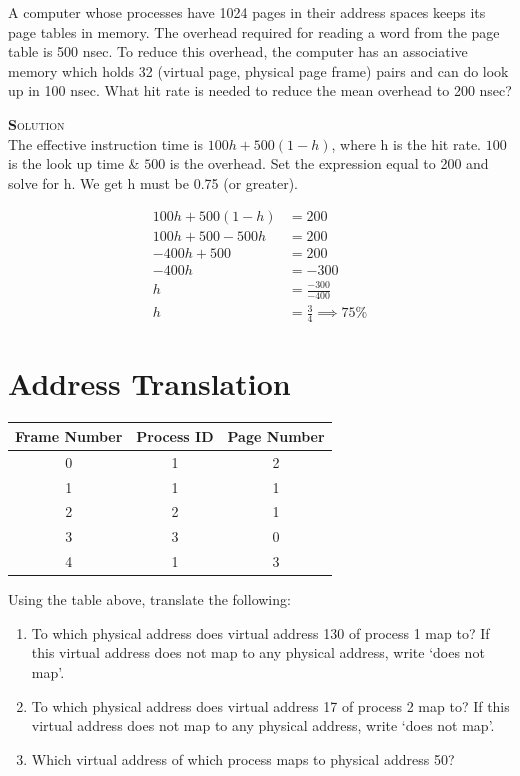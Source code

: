 \documentclass{article}
\newcommand{\smallcaps}[1]{\textsc{\textbf #1}\\}
\begin{document}
  \begin{multicols}{2}
    A computer whose processes have 1024 pages in their address spaces keeps
    its page tables in memory. The overhead required for reading a word from
    the page table is 500 nsec.  To reduce this  overhead, the computer has an
    associative  memory  which holds 32 (virtual  page,  physical  page frame)
    pairs and can do look up in 100 nsec.  What hit rate is needed  to reduce
    the mean overhead to 200 nsec?

    \smallcaps{Solution}

    The effective instruction time is $100h + 500(1-h)$, where h is the
    hit rate. $100$ is the look up time \& $500$ is the overhead. Set the
    expression equal to 200 and solve for h. We get h must be 0.75 (or greater).

    \begin{align*}
      100h + 500(1-h) &= 200 \\
      100h + 500 - 500h &= 200 \\
      -400h + 500 &= 200 \\
      -400h &= -300 \\
      h &= \frac{-300}{-400} \\
      h &= \frac{3}{4} \implies 75\%
    \end{align*}

    \section*{Address Translation}
    \begin{tabular}{|c|c|c|}
      \hline
      Frame Number & Process ID & Page Number \\
      \hline
      0 & 1 & 2 \\
      \hline
      1 & 1 & 1 \\
      \hline
      2 & 2 & 1 \\
      \hline
      3 & 3 & 0 \\
      \hline
      4 & 1 & 3 \\
      \hline
    \end{tabular}

    Using the table above, translate the following:

    \begin{enumerate}
      \item To which physical address does virtual address 130 of process 1 map to?
        If this virtual address does not map to any physical address, write `does not map'.
      \item To which physical address does virtual address 17 of process 2 map to?
        If this virtual address does not map to any physical address, write `does not map'.
      \item Which virtual address of which process maps to physical address 50?
    \end{enumerate}


\end{multicols}
\end{document}

